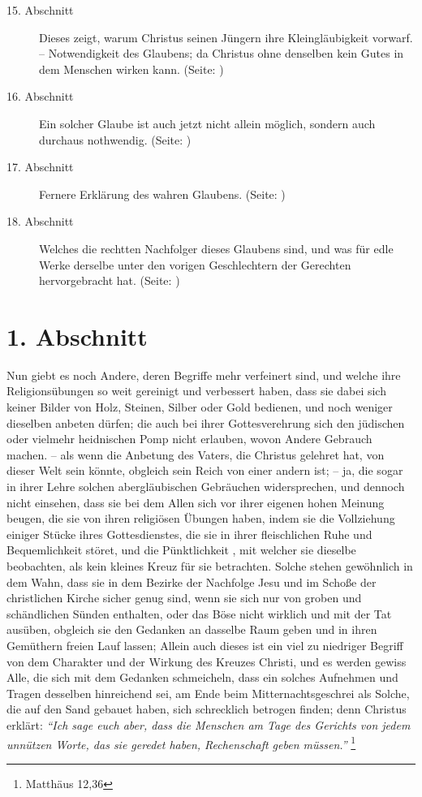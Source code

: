 \begin{description}
\item[15. Abschnitt] Dieses zeigt, warum Christus seinen Jüngern ihre
Kleingläubigkeit vorwarf. -- Notwendigkeit des Glaubens; da Christus ohne
denselben kein Gutes in dem Menschen wirken kann. (Seite: \pageref{kap6_ab15})
\item[16. Abschnitt] Ein solcher Glaube ist auch jetzt nicht allein möglich,
sondern auch durchaus nothwendig. (Seite: \pageref{kap6_ab16})
\item[17. Abschnitt] Fernere Erklärung des wahren Glaubens. (Seite:
\pageref{kap6_ab17})
\item[18. Abschnitt] Welches die rechtten Nachfolger dieses Glaubens sind, und
was für edle Werke derselbe unter den vorigen Geschlechtern der Gerechten
hervorgebracht hat. (Seite: \pageref{kap6_ab18})

\end{description}
\normalsize


\section{1. Abschnitt} \label{kap6_ab1}

Nun giebt es noch Andere, deren Begriffe mehr
verfeinert sind, und welche ihre
Religionsübungen so weit
gereinigt und verbessert haben, dass sie dabei sich keiner Bilder von Holz,
Steinen, Silber oder Gold bedienen,
und noch weniger dieselben anbeten dürfen; die auch bei ihrer Gottesverehrung
sich den jüdischen  oder vielmehr heidnischen Pomp nicht
erlauben, wovon Andere
Gebrauch
machen.  -- als wenn die Anbetung des Vaters, die Christus
gelehret hat, von
dieser Welt sein könnte, obgleich sein Reich von einer andern ist; -- ja, die
sogar in ihrer Lehre solchen abergläubischen Gebräuchen widersprechen, und
dennoch nicht einsehen, dass sie bei dem Allen sich vor ihrer eigenen hohen
Meinung beugen, die sie von ihren religiösen Übungen haben, indem sie die
Vollziehung einiger Stücke ihres Gottesdienstes, die sie in ihrer fleischlichen
Ruhe und Bequemlichkeit störet, und die Pünktlichkeit , mit
welcher sie dieselbe
beobachten, als
kein kleines Kreuz für sie betrachten. Solche stehen
gewöhnlich in dem Wahn,
dass sie in dem Bezirke der Nachfolge Jesu und im Schoße der christlichen
Kirche sicher genug sind, wenn sie sich nur von groben und schändlichen Sünden
enthalten,   oder das Böse
nicht wirklich und mit der Tat ausüben, obgleich sie
den Gedanken an dasselbe Raum geben und in ihren Gemüthern freien Lauf lassen;
Allein auch dieses ist ein viel zu niedriger Begriff von dem Charakter und der
Wirkung des Kreuzes Christi, und es werden gewiss Alle, die sich mit dem
Gedanken schmeicheln, dass ein solches Aufnehmen und Tragen desselben
hinreichend sei,  am Ende beim Mitternachtsgeschrei als
Solche, die auf den Sand
gebauet haben, sich schrecklich betrogen finden; denn Christus erklärt:
\textit{"`Ich sage euch aber, dass die Menschen am Tage des Gerichts von jedem
unnützen Worte, das sie geredet haben, Rechenschaft geben müssen."'} 
\footnote{Matthäus 12,36}


